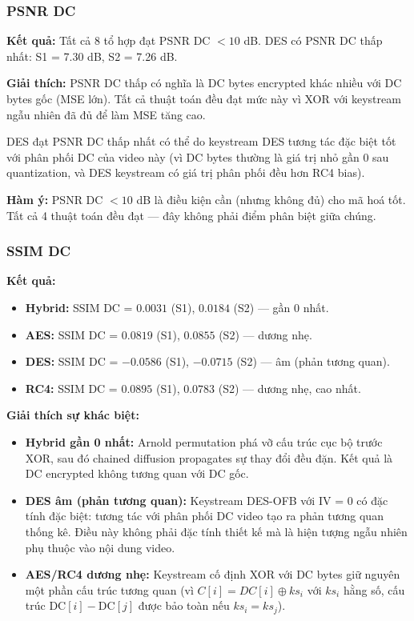 \subsubsection{PSNR DC}

\textbf{Kết quả:} Tất cả 8 tổ hợp đạt PSNR DC $< 10$ dB.
DES có PSNR DC thấp nhất: S1 = 7.30 dB, S2 = 7.26 dB.

\textbf{Giải thích:} PSNR DC thấp có nghĩa là DC bytes encrypted khác nhiều với
DC bytes gốc (MSE lớn). Tất cả thuật toán đều đạt mức này vì XOR với keystream
ngẫu nhiên đã đủ để làm MSE tăng cao.

DES đạt PSNR DC thấp nhất có thể do keystream DES tương tác đặc biệt tốt với
phân phối DC của video này (vì DC bytes thường là giá trị nhỏ gần 0 sau quantization,
và DES keystream có giá trị phân phối đều hơn RC4 bias).

\textbf{Hàm ý:} PSNR DC $< 10$ dB là điều kiện cần (nhưng không đủ) cho mã hoá tốt.
Tất cả 4 thuật toán đều đạt --- đây không phải điểm phân biệt giữa chúng.

\subsubsection{SSIM DC}

\textbf{Kết quả:}
\begin{itemize}
  \item \textbf{Hybrid:} SSIM DC = $0.0031$ (S1), $0.0184$ (S2) --- gần 0 nhất.
  \item \textbf{AES:} SSIM DC = $0.0819$ (S1), $0.0855$ (S2) --- dương nhẹ.
  \item \textbf{DES:} SSIM DC = $-0.0586$ (S1), $-0.0715$ (S2) --- âm (phản tương quan).
  \item \textbf{RC4:} SSIM DC = $0.0895$ (S1), $0.0783$ (S2) --- dương nhẹ, cao nhất.
\end{itemize}

\textbf{Giải thích sự khác biệt:}
\begin{itemize}
  \item \textbf{Hybrid gần 0 nhất:} Arnold permutation phá vỡ cấu trúc cục bộ
        trước XOR, sau đó chained diffusion propagates sự thay đổi đều đặn.
        Kết quả là DC encrypted không tương quan với DC gốc.

  \item \textbf{DES âm (phản tương quan):} Keystream DES-OFB với IV = 0 có
        đặc tính đặc biệt: tương tác với phân phối DC video tạo ra phản tương quan
        thống kê. Điều này không phải đặc tính thiết kế mà là hiện tượng ngẫu nhiên
        phụ thuộc vào nội dung video.

  \item \textbf{AES/RC4 dương nhẹ:} Keystream cố định XOR với DC bytes giữ nguyên
        một phần cấu trúc tương quan (vì $C[i] = DC[i] \oplus ks_i$ với $ks_i$ hằng số,
        cấu trúc $\text{DC}[i] - \text{DC}[j]$ được bảo toàn nếu $ks_i = ks_j$).
\end{itemize}

